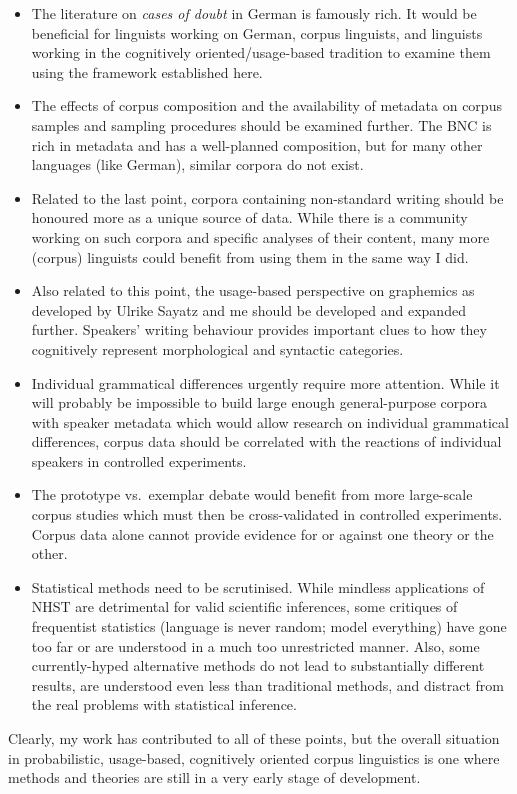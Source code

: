 \begin{itemize}
  \item The literature on \textit{cases of doubt} in German is famously rich.
    It would be beneficial for linguists working on German, corpus linguists, and linguists working in the cognitively oriented\slash usage-based tradition to examine them using the framework established here.
  \item The effects of corpus composition and the availability of metadata on corpus samples and sampling procedures should be examined further.
    The BNC is rich in metadata and has a well-planned composition, but for many other languages (like German), similar corpora do not exist.
  \item Related to the last point, corpora containing non-standard writing should be honoured more as a unique source of data.
    While there is a community working on such corpora and specific analyses of their content, many more (corpus) linguists could benefit from using them in the same way I did.
  \item Also related to this point, the usage-based perspective on graphemics as developed by Ulrike Sayatz and me should be developed and expanded further.
    Speakers' writing behaviour provides important clues to how they cognitively represent morphological and syntactic categories.
  \item Individual grammatical differences urgently require more attention.
    While it will probably be impossible to build large enough general-purpose corpora with speaker metadata which would allow research on individual grammatical differences, corpus data should be correlated with the reactions of individual speakers in controlled experiments.
  \item The prototype vs.\ exemplar debate would benefit from more large-scale corpus studies which must then be cross-validated in controlled experiments.
    Corpus data alone cannot provide evidence for or against one theory or the other.
  \item Statistical methods need to be scrutinised.
    While mindless applications of NHST are detrimental for valid scientific inferences, some critiques of frequentist statistics (language is never random; model everything) have gone too far or are understood in a much too unrestricted manner.
    Also, some currently-hyped alternative methods do not lead to substantially different results, are understood even less than traditional methods, and distract from the real problems with statistical inference.
\end{itemize}

\vspace{\baselineskip}

Clearly, my work has contributed to all of these points, but the overall situation in probabilistic, usage-based, cognitively oriented corpus linguistics is one where methods and theories are still in a very early stage of development.
